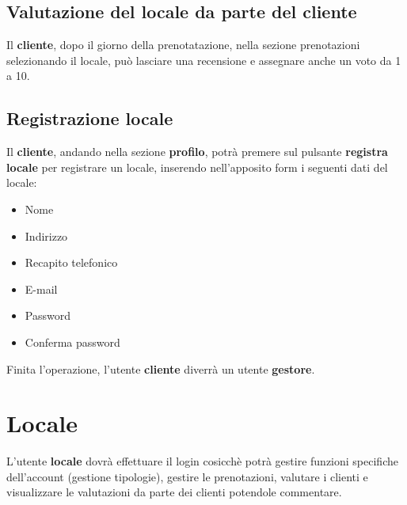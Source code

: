 \subsection{Valutazione del locale da parte del cliente}
Il \textbf{cliente}, dopo il giorno della prenotatazione, nella sezione prenotazioni selezionando il locale, può lasciare una
recensione e assegnare anche un voto da 1 a 10.

\subsection{Registrazione locale} 
Il \textbf{cliente}, andando nella sezione \textbf{profilo}, potrà premere sul pulsante \textbf{registra locale}
per registrare un locale, inserendo nell'apposito form i seguenti dati del locale:
\begin{itemize}
    \item Nome
    \item Indirizzo
    \item Recapito telefonico
    \item E-mail 
    \item Password
    \item Conferma password
    \label{itm:datiLocale}
\end{itemize}
Finita l'operazione, l'utente \textbf{cliente} diverrà un utente \textbf{gestore}.

\section*{Locale} \label{sec:locale}
L'utente \textbf{locale} dovrà effettuare il login cosicchè potrà gestire funzioni specifiche dell'account (gestione tipologie), gestire
le prenotazioni, valutare i clienti e visualizzare le valutazioni da parte dei clienti potendole commentare.

